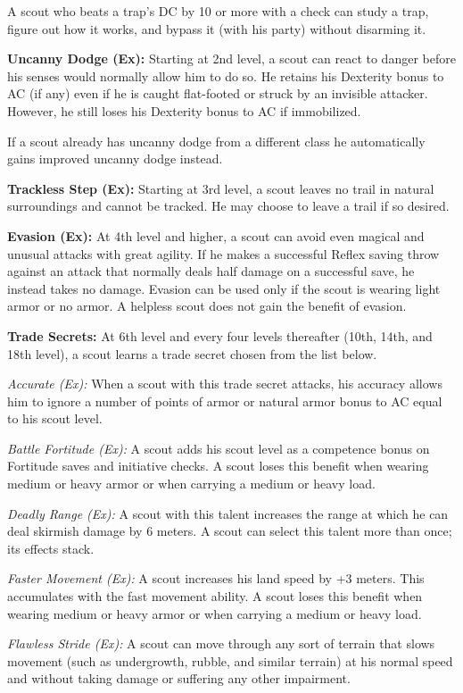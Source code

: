 A scout who beats a trap's DC by 10 or more with a  check can study a trap, figure out how it works, and bypass it (with his party) without disarming it.


\textbf{Uncanny Dodge (Ex):} Starting at 2nd level, a scout can react to danger before his senses would normally allow him to do so. He retains his Dexterity bonus to AC (if any) even if he is caught flat-footed or struck by an invisible attacker. However, he still loses his Dexterity bonus to AC if immobilized.

If a scout already has uncanny dodge from a different class he automatically gains improved uncanny dodge instead.


\textbf{Trackless Step (Ex):} Starting at 3rd level, a scout leaves no trail in natural surroundings and cannot be tracked. He may choose to leave a trail if so desired.


\textbf{Evasion (Ex):} At 4th level and higher, a scout can avoid even magical and unusual attacks with great agility. If he makes a successful Reflex saving throw against an attack that normally deals half damage on a successful save, he instead takes no damage. Evasion can be used only if the scout is wearing light armor or no armor. A helpless scout does not gain the benefit of evasion.


\textbf{Trade Secrets:} At 6th level and every four levels thereafter (10th, 14th, and 18th level), a scout learns a trade secret chosen from the list below.

\textit{Accurate (Ex):} When a scout with this trade secret attacks, his accuracy allows him to ignore a number of points of armor or natural armor bonus to AC equal to \onequarter his scout level.

\textit{Battle Fortitude (Ex):} A scout adds \onequarter his scout level as a competence bonus on Fortitude saves and initiative checks. A scout loses this benefit when wearing medium or heavy armor or when carrying a medium or heavy load.

\textit{Deadly Range (Ex):} A scout with this talent increases the range at which he can deal skirmish damage by 6 meters. A scout can select this talent more than once; its effects stack.

\textit{Faster Movement (Ex):} A scout increases his land speed by +3 meters. This accumulates with the fast movement ability. A scout loses this benefit when wearing medium or heavy armor or when carrying a medium or heavy load.

\textit{Flawless Stride (Ex):} A scout can move through any sort of terrain that slows movement (such as undergrowth, rubble, and similar terrain) at his normal speed and without taking damage or suffering any other impairment.

